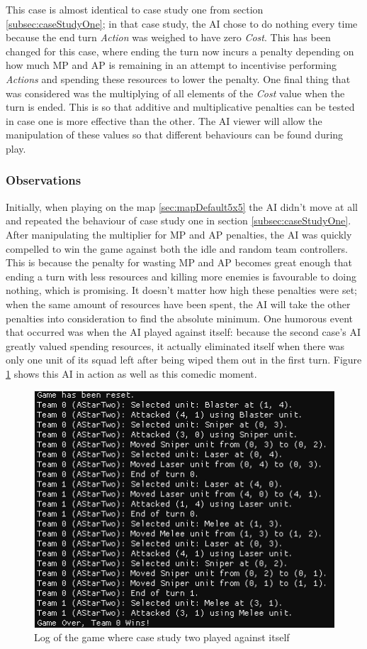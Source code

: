 \documentclass[11pt, a4paper]{report}
\begin{document}
This case is almost identical to case study one from section \ref{subsec:caseStudyOne}; in that case study, the AI chose to do nothing every time because the end turn \emph{Action} was weighed to have zero \emph{Cost}. This has been changed for this case, where ending the turn now incurs a penalty depending on how much MP and AP is remaining in an attempt to incentivise performing \emph{Actions} and spending these resources to lower the penalty. One final thing that was considered was the multiplying of all elements of the \emph{Cost} value when the turn is ended. This is so that additive and multiplicative penalties can be tested in case one is more effective than the other. The AI viewer will allow the manipulation of these values so that different behaviours can be found during play. 

\subsubsection{Observations}

Initially, when playing on the map \ref{sec:mapDefault5x5} the AI didn't move at all and repeated the behaviour of case study one in section \ref{subsec:caseStudyOne}. After manipulating the multiplier for MP and AP penalties, the AI was quickly compelled to win the game against both the idle and random team controllers. This is because the penalty for wasting MP and AP becomes great enough that ending a turn with less resources and killing more enemies is favourable to doing nothing, which is promising. It doesn't matter how high these penalties were set; when the same amount of resources have been spent, the AI will take the other penalties into consideration to find the absolute minimum. One humorous event that occurred was when the AI played against itself: because the second case's AI greatly valued spending resources, it actually eliminated itself when there was only one unit of its squad left after being wiped them out in the first turn. Figure \ref{fig:caseStudyTwoSuicide} shows this AI in action as well as this comedic moment.

\begin{figure}[!h]
  \centering
  \includegraphics[width=12cm]{img/case_two_suicide.png}
  \caption{Log of the game where case study two played against itself}
  \label{fig:caseStudyTwoSuicide}
\end{figure}
\end{document}
